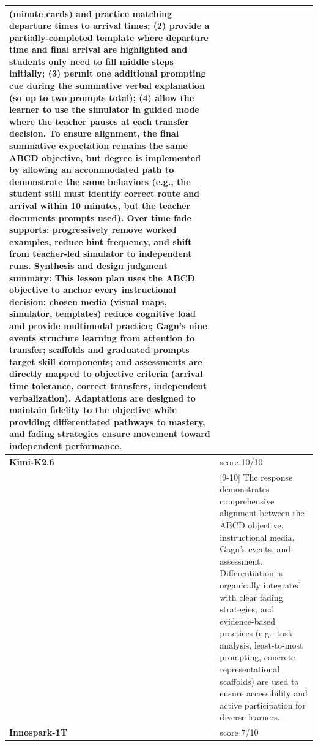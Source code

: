 \begin{longtable}{@{}l p{12.5cm}@{}}
(minute cards) and practice matching departure times to arrival times; (2) provide a partially-completed template where departure time and final arrival are highlighted and students only need to fill middle steps initially; (3) permit one additional prompting cue during the summative verbal explanation (so up to two prompts total); (4) allow the learner to use the simulator in guided mode where the teacher pauses at each transfer decision. To ensure alignment, the final summative expectation remains the same ABCD objective, but degree is implemented by allowing an accommodated path to demonstrate the same behaviors (e.g., the student still must identify correct route and arrival within 10 minutes, but the teacher documents prompts used). Over time fade supports: progressively remove worked examples, reduce hint frequency, and shift from teacher-led simulator to independent runs. \newline Synthesis and design judgment summary: This lesson plan uses the ABCD objective to anchor every instructional decision: chosen media (visual maps, simulator, templates) reduce cognitive load and provide multimodal practice; Gagn's nine events structure learning from attention to transfer; scaffolds and graduated prompts target skill components; and assessments are directly mapped to objective criteria (arrival time tolerance, correct transfers, independent verbalization). Adaptations are designed to maintain fidelity to the objective while providing differentiated pathways to mastery, and fading strategies ensure movement toward independent performance. \\
  \midrule
  \textbf{Kimi-K2.6} & score 10/10 \\
  & [9-10] The response demonstrates comprehensive alignment between the ABCD objective, instructional media, Gagn's events, and assessment. Differentiation is organically integrated with clear fading strategies, and evidence-based practices (e.g., task analysis, least-to-most prompting, concrete-representational scaffolds) are used to ensure accessibility and active participation for diverse learners. \\
  \textbf{Innospark-1T} & score 7/10 \\

\end{longtable}
